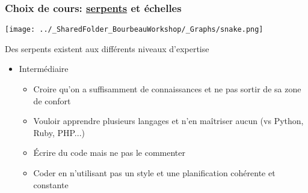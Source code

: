 \documentclass{beamer}
\begin{document}
    \begin{frame}
    
      \frametitle{Choix de cours: \uline{serpents} et échelles} \vspace{1cm}
      
        \begin{center}
        
          \texttt{[image: ../\_SharedFolder\_BourbeauWorkshop/\_Graphs/snake.png]}
         
        \end{center} 
        
  Des serpents existent aux différents niveaux d'expertise
      
    \begin{itemize}
        
      \item{Intermédiaire}
        
          \begin{itemize}
            \item Croire qu'on a suffisamment de connaissances et ne pas sortir de sa zone de confort
            \item Vouloir apprendre plusieurs langages et n'en maîtriser aucun (\R vs Python, Ruby, PHP...)
            \item Écrire du code mais ne pas le commenter
            \item Coder en n'utilisant pas un style et une planification cohérente et constante 

          \end{itemize}
        
        \end{itemize}
        
     \end{frame}
  
\end{document}
